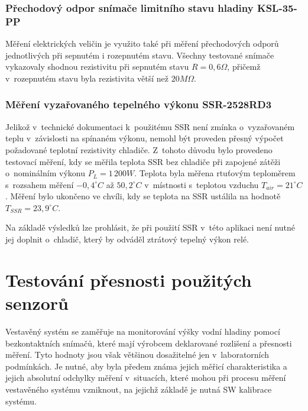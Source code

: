         \subsubsection{Přechodový odpor snímače limitního stavu hladiny KSL-35-PP}
            Měření elektrických veličin je využito také při měření přechodových odporů jednotlivých  při sepnutém i rozepnutém stavu. Všechny testované snímače vykazovaly shodnou rezistivitu při sepnutém stavu $R=0,6\unit{\Omega}$, přičemž v~rozepnutém stavu byla rezistivita větší než $20\unit{M\Omega}$.

        \subsubsection{Měření vyzařovaného tepelného výkonu SSR-2528RD3}
            Jelikož v~technické dokumentaci k~použitému SSR není zmínka o~vyzařovaném teplu v~závislosti na spínaném výkonu, nemohl být proveden přesný výpočet požadované teplotní rezistivity chladiče. Z~tohoto důvodu bylo provedeno testovací měření, kdy se měřila teplota SSR bez chladiče při zapojené zátěži o~nominálním výkonu $P_L = 1\,200\unit{W}$. Teplota byla měřena rtuťovým teploměrem s~rozsahem měření $-0,4^\circ\unit{C}$ až $50,2^\circ\unit{C}$ v~místnosti s~teplotou vzduchu $T_{air} = 21^\circ\unit{C}$. Měření bylo ukončeno ve chvíli, kdy se teplota na SSR ustálila na hodnotě $T_{SSR} = 23,9^\circ\unit{C}$. 

            Na základě výsledků lze prohlásit, že při použití SSR v~této aplikaci není nutné jej doplnit o~chladič, který by odváděl ztrátový tepelný výkon relé.

    \section{Testování přesnosti použitých senzorů}
        Vestavěný systém se zaměřuje na monitorování výšky vodní hladiny pomocí bezkontaktních snímačů, které mají výrobcem deklarované rozlišení a přesnosti měření. Tyto hodnoty jsou však většinou dosažitelné jen v~laboratorních podmínkách. Je nutné, aby byla předem známa jejich měřicí charakteristika a jejich absolutní odchylky měření v~situacích, které mohou při procesu měření vestavěného systému vzniknout, na jejichž základě je nutná SW kalibrace systému. 

